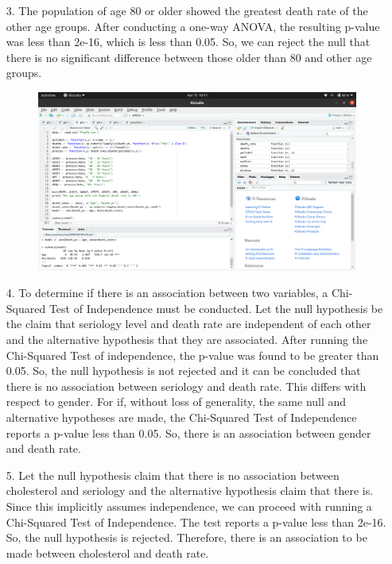 \documentclass[12pt]{article}
\begin{document}
\begin{enumerate}
\begin{figure}[!h]
	\end{figure}
	\item[3.] The population of age 80 or older showed the greatest death rate of the other age groups. 
		After conducting a one-way ANOVA, the resulting p-value was less than 2e-16, which is less than 0.05.
		So, we can reject the null that there is no significant difference between those older than 80 and other age groups.
	\begin{figure}[!h]
		\centering
		\includegraphics[width=\linewidth]{p3.png}
	\end{figure}
	\item[4.] To determine if there is an association between two variables, a Chi-Squared Test of Independence must 
		be conducted. Let the null hypothesis be the claim that seriology level and death rate are independent of 
		each other and the alternative hypothesis that they are associated. After running the Chi-Squared Test of 
		independence, the p-value was found to be greater than 0.05. So, the null hypothesis is not rejected and it can be 
		concluded that there is no association between seriology and death rate. This differs with respect to gender. 
		For if, without loss of generality, the same null and alternative hypotheses are made, the Chi-Squared Test 
		of Independence reports a p-value less than 0.05. So, there is an association between gender and death rate.
	\item[5.] Let the null hypothesis claim that there is no association between cholesterol and seriology and the 
		alternative hypothesis claim that there is. Since this implicitly assumes independence, we can proceed 
		with running a Chi-Squared Test of Independence. The test reports a p-value less than 2e-16. So, the null 
		hypothesis is rejected. Therefore, there is an association to be made between cholesterol and death rate.

\end{enumerate}
\end{document}
